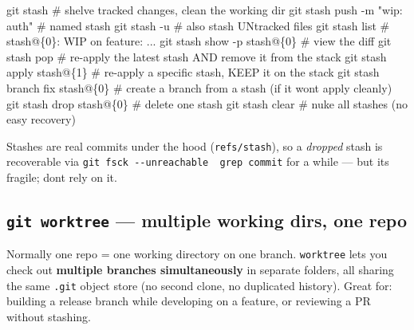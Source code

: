 \documentclass[11pt]{article}
\newenvironment{Shaded}{\begin{snugshade}}{\end{snugshade}}
\newcommand{\AttributeTok}[1]{\textcolor[rgb]{0.16,0.50,0.73}{#1}}
\newcommand{\CommentTok}[1]{\textcolor[rgb]{0.48,0.49,0.49}{#1}}
\newcommand{\FunctionTok}[1]{\textcolor[rgb]{0.56,0.27,0.68}{#1}}
\newcommand{\NormalTok}[1]{\textcolor[rgb]{0.81,0.81,0.76}{#1}}
\newcommand{\StringTok}[1]{\textcolor[rgb]{0.96,0.31,0.31}{#1}}
\begin{document}

\begin{Shaded}
\begin{Highlighting}[]
\FunctionTok{git}\NormalTok{ stash                       }\CommentTok{\# shelve tracked changes, clean the working dir}
\FunctionTok{git}\NormalTok{ stash push }\AttributeTok{{-}m} \StringTok{"wip: auth"}   \CommentTok{\# named stash}
\FunctionTok{git}\NormalTok{ stash }\AttributeTok{{-}u}                    \CommentTok{\# also stash UNtracked files}
\FunctionTok{git}\NormalTok{ stash list                  }\CommentTok{\# stash@\{0\}: WIP on feature: ...}
\FunctionTok{git}\NormalTok{ stash show }\AttributeTok{{-}p}\NormalTok{ stash@\{0\}     }\CommentTok{\# view the diff}
\FunctionTok{git}\NormalTok{ stash pop                   }\CommentTok{\# re{-}apply the latest stash AND remove it from the stack}
\FunctionTok{git}\NormalTok{ stash apply stash@\{1\}       }\CommentTok{\# re{-}apply a specific stash, KEEP it on the stack}
\FunctionTok{git}\NormalTok{ stash branch fix stash@\{0\}  }\CommentTok{\# create a branch from a stash (if it won\textquotesingle{}t apply cleanly)}
\FunctionTok{git}\NormalTok{ stash drop stash@\{0\}        }\CommentTok{\# delete one stash}
\FunctionTok{git}\NormalTok{ stash clear                 }\CommentTok{\# nuke all stashes (no easy recovery)}
\end{Highlighting}
\end{Shaded}

Stashes are real commits under the hood (\texttt{refs/stash}), so a \emph{dropped} stash is recoverable via \texttt{git\ fsck\ -\/-unreachable\ \textbar{}\ grep\ commit} for a while --- but it\textquotesingle s fragile; don\textquotesingle t rely on it.

\subsection{\texorpdfstring{\texttt{git\ worktree} --- multiple working dirs, one repo}{git worktree --- multiple working dirs, one repo}}\label{git-worktree--multiple-working-dirs-one-repo}

Normally one repo = one working directory on one branch. \texttt{worktree} lets you check out \textbf{multiple branches simultaneously} in separate folders, all sharing the same \texttt{.git} object store (no second clone, no duplicated history). Great for: building a release branch while developing on a feature, or reviewing a PR without stashing.

\end{document}
